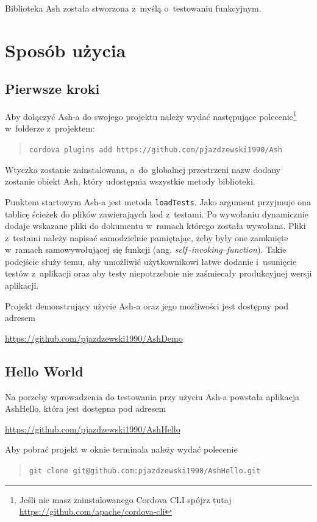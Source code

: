 \documentclass[brudnopis]{xmgr}
\begin{document}
Biblioteka Ash została stworzona z~myślą o~testowaniu funkcyjnym.

\chapter{Sposób użycia}
\section{Pierwsze kroki}

Aby dołączyć Ash-a do swojego projektu należy wydać następujące polecenie\footnote{Jeśli nie masz zainstalowanego Cordova CLI spójrz tutaj \url{https://github.com/apache/cordova-cli} } w~folderze z~projektem:
\begin{quote}
   \texttt{cordova plugins add https://github.com/pjazdzewski1990/Ash}
\end{quote}

Wtyczka zostanie zainstalowana, a~do~globalnej przestrzeni nazw dodany zostanie obiekt Ash, który udostępnia wszystkie metody biblioteki.

Punktem startowym Ash-a jest metoda \texttt{loadTests}. Jako argument przyjmuje ona tablicę ścieżek do plików zawierająych kod z~testami. Po wywołaniu dynamicznie dodaje wskazane pliki do dokumentu w~ramach którego została wywołana. Pliki z~testami należy napisać samodzielnie pamiętając, żeby były one zamknięte w~ramach samowywołującej się funkcji (ang. \textit{self--invoking--function}). Takie podejście służy temu, aby umożliwić użytkownikowi łatwe dodanie i~usunięcie testów z~aplikacji oraz aby testy niepotrzebnie nie zaśmiecały produkcyjnej wersji aplikacji.

Projekt demonstrujący użycie Ash-a oraz jego możliwości jest dostępny pod adresem

\url{https://github.com/pjazdzewski1990/AshDemo}

\section{Hello World}

Na porzeby wprowadzenia do testowania przy użyciu Ash-a powstała aplikacja AshHello, która jest dostępna pod adresem 

\url{https://github.com/pjazdzewski1990/AshHello}

Aby pobrać projekt w oknie terminala należy wydać polecenie

\begin{quote}
   \texttt{git clone git@github.com:pjazdzewski1990/AshHello.git}
\end{quote}
\end{document}
